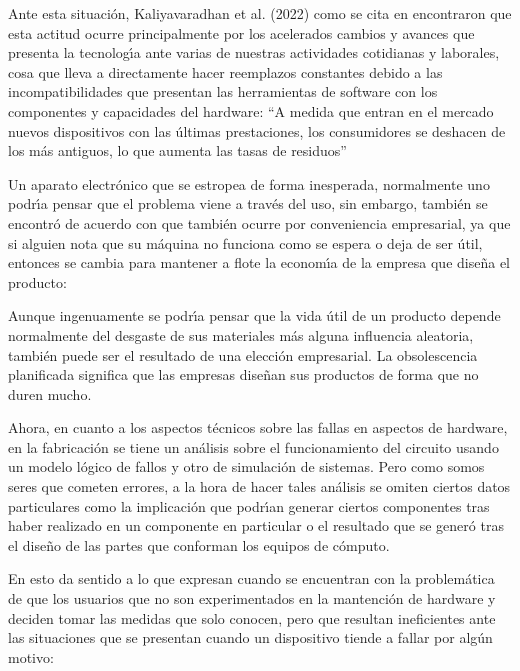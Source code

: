 Ante esta situaci\'on, Kaliyavaradhan et al. (2022) como se cita en
\textcite{Seif2024} encontraron que esta actitud ocurre principalmente por los
acelerados cambios y avances que presenta la tecnolog\'{\i}a ante varias de nuestras
actividades cotidianas y laborales, cosa que lleva a directamente hacer
reemplazos constantes debido a las incompatibilidades que presentan las
herramientas de software con los componentes y capacidades del hardware: ``A
medida que entran en el mercado nuevos dispositivos con las \'ultimas
prestaciones, los consumidores se deshacen de los m\'as antiguos, lo que aumenta
las tasas de residuos''

Un aparato electr\'onico que se estropea de forma inesperada, normalmente uno
podr\'{\i}a pensar que el problema viene a trav\'es del uso, sin embargo, tambi\'en se
encontr\'o de acuerdo con \textcite{Hartl2023} que tambi\'en ocurre por
conveniencia empresarial, ya que si alguien nota que su m\'aquina no funciona
como se espera o deja de ser \'util, entonces se cambia para mantener a flote la
econom\'{\i}a de la empresa que dise\~na el producto:

\begin{displayquote}
	Aunque ingenuamente se podr\'{\i}a pensar que la vida \'util de un producto depende
	normalmente del desgaste de sus materiales m\'as alguna influencia aleatoria,
	tambi\'en puede ser el resultado de una elecci\'on empresarial. La obsolescencia
	planificada significa que las empresas dise\~nan sus productos de forma que no
	duren mucho.
\end{displayquote}

Ahora, en cuanto a los aspectos t\'ecnicos sobre las fallas en aspectos de
hardware, en la fabricaci\'on se tiene un an\'alisis sobre el funcionamiento del
circuito usando un modelo l\'ogico de fallos y otro de simulaci\'on de sistemas. Pero
como somos seres que cometen errores, a la hora de hacer tales an\'alisis se
omiten ciertos datos particulares como la implicaci\'on que podr\'{\i}an generar
ciertos componentes tras haber realizado en un componente en particular o el
resultado que se gener\'o tras el dise\~no de las partes que conforman los equipos
de c\'omputo. \parencite{Jin2023}

En esto da sentido a lo que expresan \textcite{Zailani2021} cuando se
encuentran con la problem\'atica de que los usuarios que no son experimentados en
la mantenci\'on de hardware y deciden tomar las medidas que solo conocen, pero
que resultan ineficientes ante las situaciones que se presentan cuando un
dispositivo tiende a fallar por alg\'un motivo:

